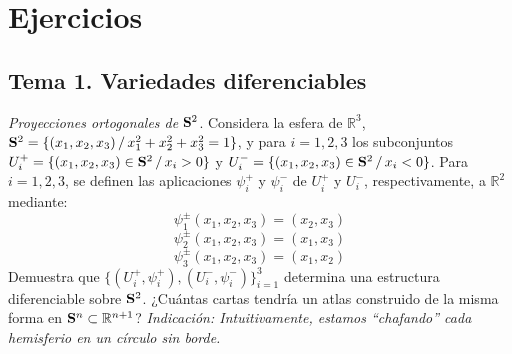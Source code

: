 \justifying
\chapter{Ejercicios}
\section{Tema 1. Variedades diferenciables}
\begin{ejer}
    [1.5] \textit{Proyecciones ortogonales de} $\bold{S}^2$. Considera la esfera de $\mathbb R^3$, $\bold{S}^2 = \{(x_1, x_2, x_3) \, / \,  x_1^2 + x_2^2 + x^2_3 = 1\}$, y para $i = 1, 2, 3$ los subconjuntos $U^+_i = \{(x_1, x_2, x_3) \in \bold{S}^2 \, / \, x_i > 0\}$ y $U^-_i =\{(x_1, x_2, x_3) \in \bold{S}^2 \, / \,  x_i < 0\}$. Para $i = 1, 2, 3$, se definen las aplicaciones $\psi^+_i$ y $\psi^-_i$ de $U^+_i$ y $U^-_i$, respectivamente, a $\mathbb R^ 2$ mediante:
    $$\psi^{\pm}_1(x_1, x_2, x_3) = (x_2, x_3)$$
    $$\psi^{\pm}_2(x_1, x_2, x_3) = (x_1, x_3)$$
    $$\psi^{\pm}_3(x_1, x_2, x_3) = (x_1, x_2)$$
Demuestra que $\{(U^+_i, \psi^+_i), (U^-_{i} , \psi^-_i)\}^{3}_{i=1}$ determina una estructura diferenciable sobre $\bold{S}^2$. ¿Cu\'antas cartas tendr\'ia un atlas construido de la misma forma en $\bold{S}^n \subset \mathbb R^{n+1}$? \textit{Indicaci\'on: Intuitivamente, estamos ``chafando'' cada hemisferio en un c\'irculo sin borde.}
\end{ejer}
